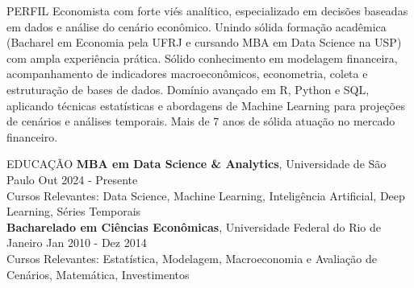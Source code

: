 \documentclass{resume}
\begin{document}
\begin{rSection}{PERFIL}
{Economista com forte viés analítico, especializado em decisões baseadas em dados e análise do cenário econômico. Unindo sólida formação acadêmica (Bacharel em Economia pela UFRJ e cursando MBA em Data Science na USP) com ampla experiência prática. Sólido conhecimento em modelagem financeira, acompanhamento de indicadores macroeconômicos, econometria, coleta e estruturação de bases de dados. Domínio avançado em R, Python e SQL, aplicando técnicas estatísticas e abordagens de Machine Learning para projeções de cenários e análises temporais. Mais de 7 anos de sólida atuação no mercado financeiro.}
\end{rSection}
\begin{rSection}{EDUCAÇÃO}
{\bf MBA em Data Science \& Analytics}, Universidade de São Paulo \hfill {Out 2024 - Presente}\\
{\footnotesize Cursos Relevantes: Data Science, Machine Learning, Inteligência Artificial, Deep Learning, Séries Temporais} \\

\vspace{-1.25em}
{\bf Bacharelado em Ciências Econômicas}, Universidade Federal do Rio de Janeiro \hfill {Jan 2010 - Dez 2014} \\
\footnotesize{Cursos Relevantes: Estatística, Modelagem, Macroeconomia e Avaliação de Cenários, Matemática, Investimentos} 
\end{rSection}
\end{document}

